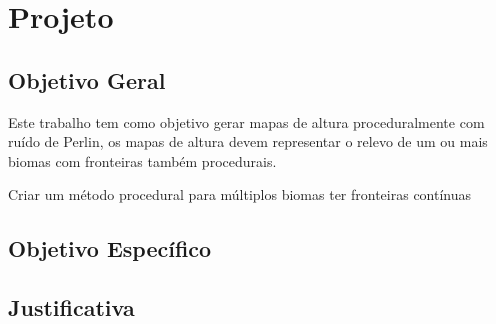 \chapter{Projeto}

\section{Objetivo Geral}
Este trabalho tem como objetivo gerar mapas de altura proceduralmente com ruído 
de Perlin, os mapas de altura devem representar o relevo de um ou mais biomas
com fronteiras também procedurais.

Criar um método procedural para múltiplos biomas ter fronteiras contínuas

\section{Objetivo Específico}


\section{Justificativa}



